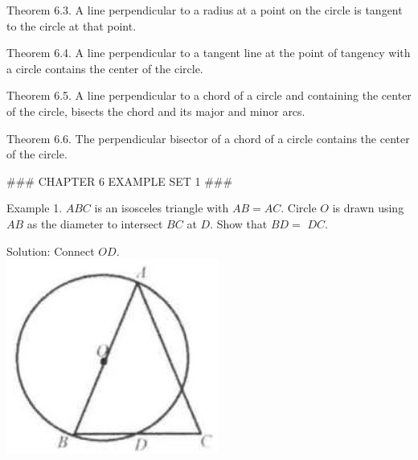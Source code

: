 \documentclass[10pt]{article}
\begin{document}
Theorem 6.3. A line perpendicular to a radius at a point on the circle is tangent to the circle at that point.

Theorem 6.4. A line perpendicular to a tangent line at the point of tangency with a circle contains the center of the circle.

Theorem 6.5. A line perpendicular to a chord of a circle and containing the center of the circle, bisects the chord and its major and minor arcs.

Theorem 6.6. The perpendicular bisector of a chord of a circle contains the center of the circle.


### CHAPTER 6 EXAMPLE SET 1 ###

Example 1. \(A B C\) is an isosceles triangle with \(A B=A C\). Circle \(O\) is drawn using \(A B\) as the diameter to intersect \(B C\) at \(D\). Show that \(B D=\) \(D C\).

Solution:
Connect \(O D\).\\
\includegraphics[max width=\textwidth, center]{2025_04_17_97bc1f7e44d93c271a88g-147(2)}
\end{document}
